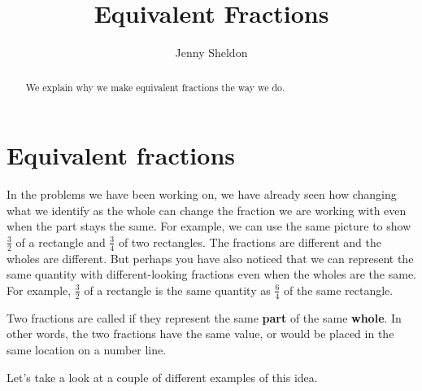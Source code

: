 \documentclass{ximera}
\title{Equivalent Fractions}
\author{Jenny Sheldon}
\begin{document}
\begin{abstract}
We explain why we make equivalent fractions the way we do.
\end{abstract}
\maketitle





\section{Equivalent fractions}

In the problems we have been working on, we have already seen how changing what we identify as the whole can change the fraction we are working with even when the part stays the same. For example, we can use the same picture to show $\frac{3}{2}$ of a rectangle and $\frac{3}{4}$ of two rectangles. The fractions are different and the wholes are different. But perhaps you have also noticed that we can represent the same quantity with different-looking fractions even when the wholes are the same. For example, $\frac{3}{2}$ of a rectangle is the same quantity as $\frac{6}{4}$ of the same rectangle.

\begin{definition}
Two fractions are called  if they represent the same {\bf part} of the same {\bf whole}. In other words, the two fractions have the same value, or would be placed in the same location on a number line.
\end{definition}

Let's take a look at a couple of different examples of this idea.
\end{document}

